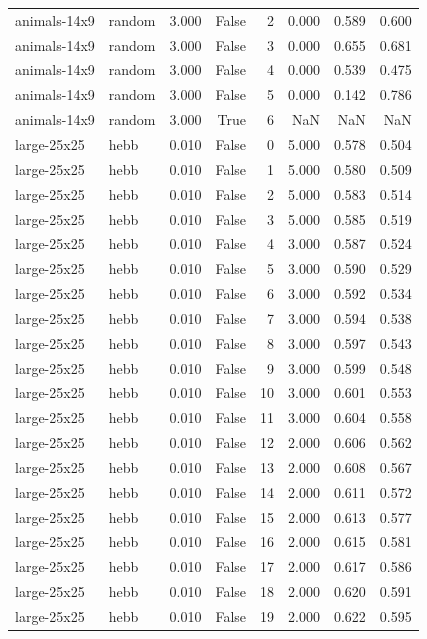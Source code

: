 \begin{tabular}{llrrrrrr}
animals-14x9 & random & 3.000 & False & 2 & 0.000 & 0.589 & 0.600 \\
animals-14x9 & random & 3.000 & False & 3 & 0.000 & 0.655 & 0.681 \\
animals-14x9 & random & 3.000 & False & 4 & 0.000 & 0.539 & 0.475 \\
animals-14x9 & random & 3.000 & False & 5 & 0.000 & 0.142 & 0.786 \\
animals-14x9 & random & 3.000 & True & 6 & NaN & NaN & NaN \\
large-25x25 & hebb & 0.010 & False & 0 & 5.000 & 0.578 & 0.504 \\
large-25x25 & hebb & 0.010 & False & 1 & 5.000 & 0.580 & 0.509 \\
large-25x25 & hebb & 0.010 & False & 2 & 5.000 & 0.583 & 0.514 \\
large-25x25 & hebb & 0.010 & False & 3 & 5.000 & 0.585 & 0.519 \\
large-25x25 & hebb & 0.010 & False & 4 & 3.000 & 0.587 & 0.524 \\
large-25x25 & hebb & 0.010 & False & 5 & 3.000 & 0.590 & 0.529 \\
large-25x25 & hebb & 0.010 & False & 6 & 3.000 & 0.592 & 0.534 \\
large-25x25 & hebb & 0.010 & False & 7 & 3.000 & 0.594 & 0.538 \\
large-25x25 & hebb & 0.010 & False & 8 & 3.000 & 0.597 & 0.543 \\
large-25x25 & hebb & 0.010 & False & 9 & 3.000 & 0.599 & 0.548 \\
large-25x25 & hebb & 0.010 & False & 10 & 3.000 & 0.601 & 0.553 \\
large-25x25 & hebb & 0.010 & False & 11 & 3.000 & 0.604 & 0.558 \\
large-25x25 & hebb & 0.010 & False & 12 & 2.000 & 0.606 & 0.562 \\
large-25x25 & hebb & 0.010 & False & 13 & 2.000 & 0.608 & 0.567 \\
large-25x25 & hebb & 0.010 & False & 14 & 2.000 & 0.611 & 0.572 \\
large-25x25 & hebb & 0.010 & False & 15 & 2.000 & 0.613 & 0.577 \\
large-25x25 & hebb & 0.010 & False & 16 & 2.000 & 0.615 & 0.581 \\
large-25x25 & hebb & 0.010 & False & 17 & 2.000 & 0.617 & 0.586 \\
large-25x25 & hebb & 0.010 & False & 18 & 2.000 & 0.620 & 0.591 \\
large-25x25 & hebb & 0.010 & False & 19 & 2.000 & 0.622 & 0.595 \\

\end{tabular}

